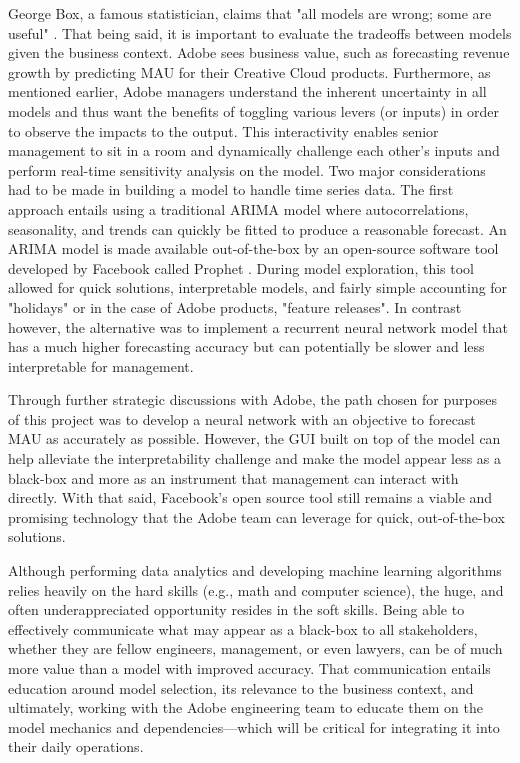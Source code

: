 \documentclass[11pt, oneside, authoryear]{report}
\begin{document}
George Box, a famous statistician, claims that "all models are wrong; some are useful" \citep{box}. That being said, it is important to evaluate the tradeoffs between models given the business context. Adobe sees business value, such as forecasting revenue growth by predicting MAU for their Creative Cloud products. Furthermore, as mentioned earlier, Adobe managers understand the inherent uncertainty in all models and thus want the benefits of toggling various levers (or inputs) in order to observe the impacts to the output. This interactivity enables senior management to sit in a room and dynamically challenge each other's inputs and perform real-time sensitivity analysis on the model.
Two major considerations had to be made in building a model to handle time series data. The first approach entails using a traditional ARIMA model where autocorrelations, seasonality, and trends can quickly be fitted to produce a reasonable forecast. An ARIMA model is made available out-of-the-box by an open-source software tool developed by Facebook called Prophet \citep{taylor}.  During model exploration, this tool allowed for quick solutions, interpretable models, and fairly simple accounting for "holidays" or in the case of Adobe products, "feature releases".  In contrast however, the alternative was to implement a recurrent neural network model that has a much higher forecasting accuracy but can potentially be slower and less interpretable for management.

Through further strategic discussions with Adobe, the path chosen for purposes of this project was to develop a neural network with an objective to forecast MAU as accurately as possible. However, the GUI built on top of the model can help alleviate the interpretability challenge and make the model appear less as a black-box and more as an instrument that management can interact with directly. With that said, Facebook's open source tool still remains a viable and promising technology that the Adobe team can leverage for quick, out-of-the-box solutions.

Although performing data analytics and developing machine learning algorithms relies heavily on the hard skills (e.g., math and computer science), the huge, and often underappreciated opportunity resides in the soft skills. Being able to effectively communicate what may appear as a black-box to all stakeholders, whether they are fellow engineers, management, or even lawyers, can be of much more value than a model with improved accuracy. That communication entails education around model selection, its relevance to the business context, and ultimately, working with the Adobe engineering team to educate them on the model mechanics and dependencies---which will be critical for integrating it into their daily operations.
\end{document}
